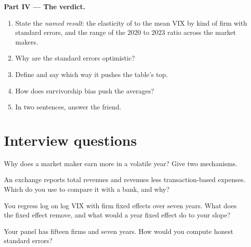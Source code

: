 \begin{problem}
\medskip\noindent\textbf{Part IV --- The verdict.}
\begin{enumerate}[resume]
\item State the \emph{named result}: the elasticity of  to the mean VIX by kind of firm with standard
errors, and the range of the 2020 to 2023 ratio across the market makers.
\item Why are the standard errors optimistic?
\item Define  and say which way it pushes the table's top.
\item How does survivorship bias push the averages?
\item In two sentences, answer the friend.
\end{enumerate}
\end{problem}

\section{Interview questions}

\begin{interviewq}\label{iq:in:revenue-and-profit-across-the-industry:1}
Why does a market maker earn more in a volatile year? Give two mechanisms.
\end{interviewq}

\begin{interviewq}\label{iq:in:revenue-and-profit-across-the-industry:2}
An exchange reports total revenues and revenues less transaction-based expenses. Which do you use to compare it with a
bank, and why?
\end{interviewq}

\begin{interviewq}\label{iq:in:revenue-and-profit-across-the-industry:3}
You regress log  on log VIX with firm fixed effects over seven years. What does the fixed effect remove,
and what would a year fixed effect do to your slope?
\end{interviewq}

\begin{interviewq}\label{iq:in:revenue-and-profit-across-the-industry:4}
Your panel has fifteen firms and seven years. How would you compute honest standard errors?
\end{interviewq}

